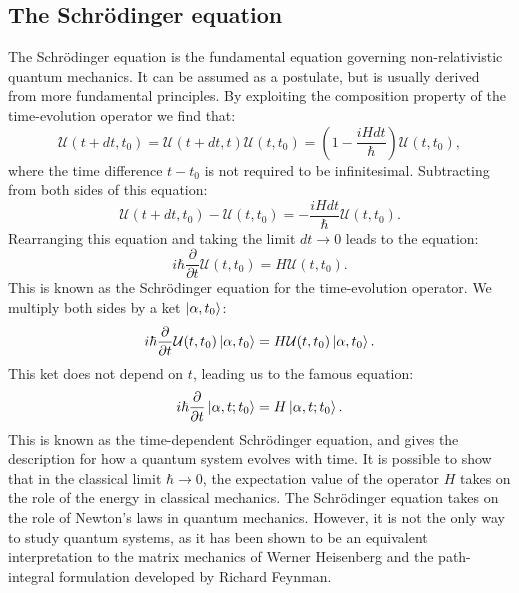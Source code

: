 \subsection{The Schr\"{o}dinger equation}
The Schr\"{o}dinger equation is the fundamental equation
governing non-relativistic quantum mechanics. It can be assumed
as a postulate, but is usually derived from more fundamental
principles.
By exploiting the composition property of the time-evolution
operator we find that:
\begin{equation}
 \mathcal{U}(t + dt, t_0) = \mathcal{U}(t + dt, t)
    \mathcal{U}(t, t_0) = (1 - \frac{i H dt}{\hbar})
    \mathcal{U}(t, t_0) ,
\end{equation}
where the time difference $t - t_0$ is not required to be infinitesimal.
Subtracting from both sides of this equation:
\begin{equation}
 \mathcal{U}(t + dt, t_0) - \mathcal{U}(t, t_0) =
    -\frac{iHdt}{\hbar} \mathcal{U}(t, t_0) .
\end{equation}
Rearranging this equation and taking the limit $dt \rightarrow 0$
leads to the equation:
\begin{equation}
 i \hbar \frac{\partial}{\partial t} \mathcal{U}(t, t_0)
    = H \mathcal{U}(t, t_0) .
\end{equation}
This is known as the Schr\"{o}dinger equation for the time-evolution operator.
We multiply both sides by a ket $\ket{\alpha, t_0}$:
\begin{equation}
 i \hbar \frac{\partial}{\partial t} \mathcal{U}(t, t_0)
    \ket{\alpha, t_0} = H \mathcal{U}(t, t_0) \ket{\alpha, t_0} .
\end{equation}
This ket does not depend on $t$, leading us to the famous equation:
\begin{equation}
 i \hbar \frac{\partial}{\partial t}
    \ket{\alpha, t; t_0} = H \ket{\alpha, t; t_0} .
\end{equation}
This is known as the time-dependent Schr\"{o}dinger equation,
and gives the description for how a quantum system evolves with time.
It is possible to show that in the classical limit
$\hbar \rightarrow 0$,
the expectation value of the operator $H$ takes on the
role of the energy in classical mechanics.
The Schr\"{o}dinger equation takes on the role
of Newton's laws in quantum mechanics. However, it is not the only
way to study quantum systems, as it has been shown to be an equivalent
interpretation to the matrix mechanics of Werner Heisenberg
and the path-integral formulation developed by Richard Feynman.

